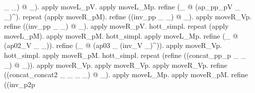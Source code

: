 \begin{coqdoccode}
\begin{coqdoccomment}
\_\coqdocindent{0.50em}
\_)\coqdocindent{0.50em}
@\coqdocindent{0.50em}
\_).\coqdocindent{0.50em}
apply\coqdocindent{0.50em}
moveL\_pV.\coqdocindent{0.50em}
apply\coqdocindent{0.50em}
moveL\_Mp.\coqdoceol
\coqdocindent{1.00em}
refine\coqdocindent{0.50em}
(\_\coqdocindent{0.50em}
@\coqdocindent{0.50em}
(ap\_pp\_pV\coqdocindent{0.50em}
\_\coqdocindent{0.50em}
\_)\^{}).\coqdocindent{0.50em}
repeat\coqdocindent{0.50em}
(apply\coqdocindent{0.50em}
moveR\_pM).\coqdoceol
\coqdocindent{1.00em}
refine\coqdocindent{0.50em}
((inv\_pp\coqdocindent{0.50em}
\_\coqdocindent{0.50em}
\_)\coqdocindent{0.50em}
@\coqdocindent{0.50em}
\_).\coqdocindent{0.50em}
apply\coqdocindent{0.50em}
moveR\_Vp.\coqdoceol
\coqdocindent{1.00em}
refine\coqdocindent{0.50em}
((inv\_pp\coqdocindent{0.50em}
\_\coqdocindent{0.50em}
\_)\coqdocindent{0.50em}
@\coqdocindent{0.50em}
\_).\coqdocindent{0.50em}
apply\coqdocindent{0.50em}
moveR\_pV.\coqdocindent{0.50em}
hott\_simpl.\coqdoceol
\coqdocindent{1.00em}
repeat\coqdocindent{0.50em}
(apply\coqdocindent{0.50em}
moveL\_pM).\coqdocindent{0.50em}
apply\coqdocindent{0.50em}
moveR\_pM.\coqdocindent{0.50em}
hott\_simpl.\coqdocindent{0.50em}
\coqdoceol
\coqdocindent{1.00em}
apply\coqdocindent{0.50em}
moveL\_Mp.\coqdocindent{0.50em}
refine\coqdocindent{0.50em}
(\_\coqdocindent{0.50em}
@\coqdocindent{0.50em}
(ap02\_V\coqdocindent{0.50em}
\_\coqdocindent{0.50em}
\_)).\coqdoceol
\coqdocindent{1.00em}
refine\coqdocindent{0.50em}
(\_\coqdocindent{0.50em}
@\coqdocindent{0.50em}
(ap03\coqdocindent{0.50em}
\_\coqdocindent{0.50em}
(inv\_V\coqdocindent{0.50em}
\_)\^{})).\coqdocindent{0.50em}
apply\coqdocindent{0.50em}
moveR\_Vp.\coqdocindent{0.50em}
hott\_simpl.\coqdoceol
\coqdocindent{1.00em}
apply\coqdocindent{0.50em}
moveR\_pM.\coqdocindent{0.50em}
hott\_simpl.\coqdoceol
\coqdocindent{1.00em}
repeat\coqdocindent{0.50em}
(refine\coqdocindent{0.50em}
((concat\_pp\_p\coqdocindent{0.50em}
\_\coqdocindent{0.50em}
\_\coqdocindent{0.50em}
\_)\coqdocindent{0.50em}
@\coqdocindent{0.50em}
\_)).\coqdocindent{0.50em}
apply\coqdocindent{0.50em}
moveR\_Vp.\coqdocindent{0.50em}
apply\coqdocindent{0.50em}
moveR\_Vp.\coqdoceol
\coqdocindent{1.00em}
apply\coqdocindent{0.50em}
moveR\_Vp.\coqdocindent{0.50em}
refine\coqdocindent{0.50em}
((concat\_concat2\coqdocindent{0.50em}
\_\coqdocindent{0.50em}
\_\coqdocindent{0.50em}
\_\coqdocindent{0.50em}
\_)\coqdocindent{0.50em}
@\coqdocindent{0.50em}
\_).\coqdoceol
\coqdocindent{1.00em}
apply\coqdocindent{0.50em}
moveL\_Mp.\coqdocindent{0.50em}
apply\coqdocindent{0.50em}
moveR\_pM.\coqdocindent{0.50em}
refine\coqdocindent{0.50em}
((inv\_p2p\coqdocindent{0.50em}

\end{coqdoccomment}
\end{coqdoccode}
